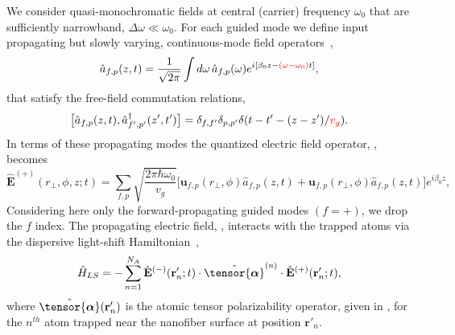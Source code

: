 \documentclass[preprint, aps,pra,onecolumn]{revtex4-1} %
\newcommand{\poltens}{\hat{\tensor{\boldsymbol{\alpha}}}}
\newcommand{\error}[1]{{\color{red} #1}}
\begin{document}
We consider quasi-monochromatic fields at central (carrier) frequency $\omega_0$ that are sufficiently narrowband, $\Delta \omega \ll \omega_0$. 
For each guided mode we define input propagating but slowly varying, continuous-mode field operators~\cite{blow_continuum_1990, le_kien_correlations_2008},
	\begin{align}
		\hat{a}_{f,p}(z,t) =\frac{1}{\sqrt{2 \pi}}  \int d \omega \, \hat{a}_{f,p}(\omega) e^{i[ \beta_0 z- \error{(\omega-\omega_0)} t ]}, 
	\end{align}
that satisfy the free-field commutation relations,
	\begin{equation} \label{Eq::InputOutputCommutation}
		\big[\hat{a}_{f,p}(z,t),\hat{a}^\dag_{f',p'}(z',t')\big]=\delta_{f,f'}\delta_{p,p'}  \delta(t-t'-(z-z')/\error{v_g}).
	\end{equation}
In terms of these propagating modes the quantized electric field operator, , becomes
	\begin{equation} \label{Eq::PropagatingElectricField}
		\hat{\mathbf{E}}^{(+)}(r\!_\perp,\phi,z;t) = \sum_{f,p} \sqrt{ \frac{2 \pi \hbar \omega_0}{ v_g} } \big[ \mathbf{u}_{f,p}(r\!_\perp,\phi) \hat{a}_{f,p}(z,t) + \mathbf{u}_{f,p}(r\!_\perp,\phi) \hat{a}_{f,p}(z,t) \big] e^{i \beta_0 z},
	\end{equation}	
Considering here only the forward-propagating guided modes $(f=+)$, we  drop the $f$ index.  
The propagating electric field, , interacts with the trapped atoms via the dispersive light-shift Hamiltonian~\cite{deutsch_quantum_2010,kien_dynamical_2013},
	\begin{equation} \label{Eq::LightShiftHam}
		\hat{H}_{LS} = - \sum_{n=1}^{N_A} \hat{\mathbf{E}}^{(-)}(\mathbf{r}'_n ; t ) \cdot \poltens^{(n)} \cdot \hat{\mathbf{E}}^{(+)}(\mathbf{r}'_n ;t ),
	\end{equation}
where $\poltens(\br'_n)$ is the atomic tensor polarizability operator, given in , for the $n^{th}$ atom trapped near the nanofiber surface at position $\mathbf{r}'_n$.   
\end{document}
